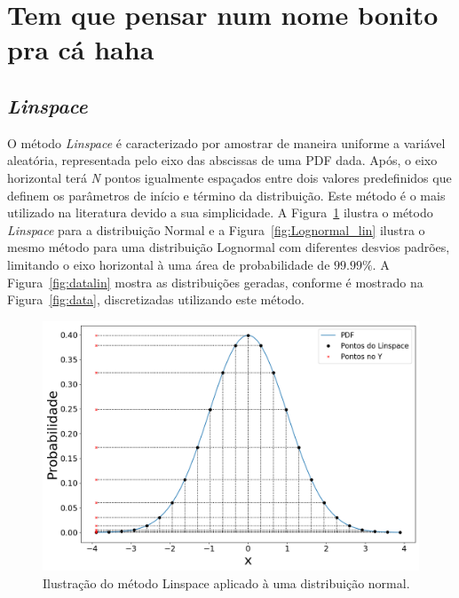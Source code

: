 \section{Tem que pensar num nome bonito pra cá haha}

\subsection{\textit{Linspace}}
O método \textit{Linspace} é caracterizado por amostrar de maneira uniforme a variável aleatória, representada pelo eixo das abscissas de uma \ac{PDF} dada. Após, o eixo horizontal terá \textit{N} pontos igualmente espaçados entre dois valores predefinidos que definem os parâmetros de início e término da distribuição. Este método é o mais utilizado na literatura devido a sua simplicidade. A Figura~\ref{fig:linspace_curve} ilustra o método \textit{Linspace} para a distribuição Normal e a Figura~\ref{fig:Lognormal_lin} ilustra o mesmo método para uma distribuição Lognormal com diferentes desvios padrões, limitando o eixo horizontal à uma área de probabilidade de $99.99\%$. A Figura~\ref{fig:datalin} mostra as distribuições geradas, conforme é mostrado na Figura~\ref{fig:data}, discretizadas utilizando este método.

\begin{figure}[H]
	\centering
	\includegraphics[width=0.7\linewidth]{./figuras/normal_1}
	\caption{Ilustração do método Linspace aplicado à uma distribuição normal.}
	\label{fig:linspace_curve}
\end{figure}

